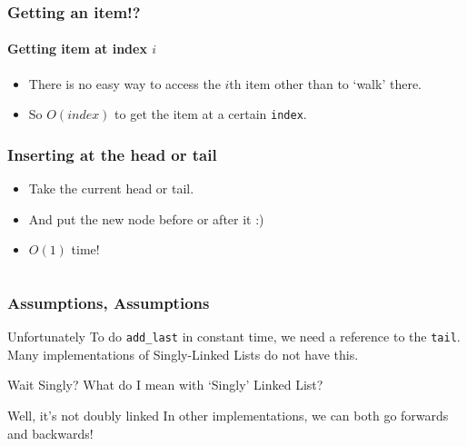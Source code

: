 \begin{frame}
	\frametitle{Getting an item!?}
	\framesubtitle{Getting item at index $i$}

	\begin{itemize}
		\item There is no easy way to access the $i$th item other than to `walk' there.
		\item So $O(\textit{index})$ to get the item at a certain \texttt{index}.
	\end{itemize}
	
\end{frame}

\begin{frame}
	\frametitle{Inserting at the head or tail}
	\begin{itemize}
		\item Take the current head or tail.
		\item And put the new node before or after it :)
		\item<4-> \alert{$O(1)$ time!}
	\end{itemize}	
	\begin{columns}[t]
			
	\end{columns}
\end{frame}

\begin{frame}
	\frametitle{Assumptions, Assumptions}
	\begin{block}{Unfortunately}
		To do \texttt{add\_last} in constant time, we need a reference to the \texttt{tail}.\\
		Many implementations of Singly-Linked Lists do not have this.
	\end{block}		
	\pause
	\begin{block}{Wait Singly?}
		What do I mean with `Singly' Linked List?	
	\end{block}
	\pause
	\begin{block}{Well, it's not doubly linked}
		In other implementations, we can both go forwards and backwards!	
	\end{block}
\end{frame}

